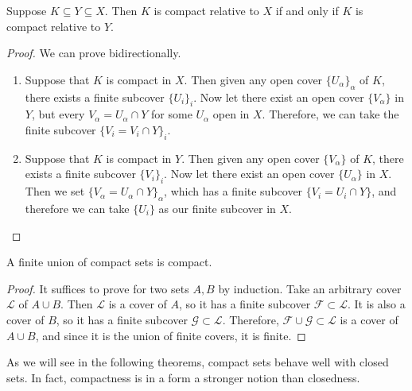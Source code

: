   \begin{theorem}
    Suppose $K \subseteq Y \subseteq X$. Then $K$ is compact relative to $X$ if and only if $K$ is compact relative to $Y$. 
  \end{theorem}
  \begin{proof}
    We can prove bidirectionally. 
    \begin{enumerate}
      \item Suppose that $K$ is compact in $X$. Then given any open cover $\{U_\alpha\}_\alpha$ of $K$, there exists a finite subcover $\{U_i\}_{i}$. Now let there exist an open cover $\{V_\alpha\}$ in $Y$, but every $V_\alpha = U_\alpha \cap Y$ for some $U_\alpha$ open in $X$. Therefore, we can take the finite subcover $\{V_i = V_i \cap Y\}_i$. 

      \item Suppose that $K$ is compact in $Y$. Then given any open cover $\{V_\alpha\}$ of $K$, there exists a finite subcover $\{V_i\}_i$. Now let there exist an open cover $\{U_\alpha\}$ in $X$. Then we set $\{V_\alpha = U_\alpha \cap Y\}_\alpha$, which has a finite subcover $\{V_i = U_i \cap Y\}$, and therefore we can take $\{U_i\}$ as our finite subcover in $X$. 
    \end{enumerate}
  \end{proof}

  \begin{theorem}
    A finite union of compact sets is compact. 
  \end{theorem}
  \begin{proof}
    It suffices to prove for two sets $A, B$ by induction. Take an arbitrary cover $\mathscr{L}$ of $A \cup B$. Then $\mathscr{L}$ is a cover of $A$, so it has a finite subcover $\mathscr{F} \subset \mathscr{L}$. It is also a cover of $B$, so it has a finite subcover $\mathscr{G} \subset \mathscr{L}$. Therefore, $\mathscr{F} \cup \mathscr{G} \subset \mathscr{L}$ is a cover of $A \cup B$, and since it is the union of finite covers, it is finite. 
  \end{proof}

  As we will see in the following theorems, compact sets behave well with closed sets. In fact, compactness is in a form a stronger notion than closedness. 

